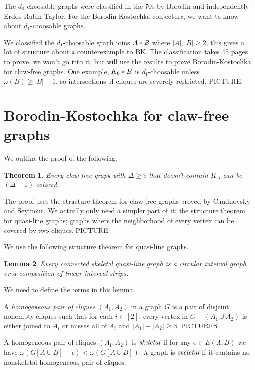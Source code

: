 \documentclass[12pt]{article}
\theoremstyle{plain}
\newtheorem{thm}{Theorem}[section]
\newtheorem{lem}[thm]{Lemma}
\theoremstyle{definition}
\theoremstyle{remark}
\newcommand{\card}[1]{\left|#1\right|}
\newcommand{\irange}[1]{\left[#1\right]}
\newcommand{\join}[2]{#1 \mbox{\hspace{2 pt}$\ast$\hspace{2 pt}} #2}
\begin{document}
The $d_0$-choosable graphs were classified in the 70s by Borodin and independently Erdos-Rubin-Taylor.  For the Borodin-Kostochka conjecture, we want to know about $d_1$-choosable graphs.

We classified the $d_1$-choosable graph joins $\join{A}{B}$ where $\card{A}, \card{B} \geq 2$, this gives a lot of structure about a counterexample to BK.  The classification takes 45 pages to prove, we won't go into it, but will use the results to prove Borodin-Kostochka for claw-free graphs.  One example, $\join{K_6}{B}$ is $d_1$-choosable unless $\omega(B) \geq \card{B} - 1$, so intersections of cliques are severely restricted.  PICTURE.

\section{Borodin-Kostochka for claw-free graphs}

\bigskip
We outline the proof of the following.
\begin{thm}
Every claw-free graph with $\Delta \geq 9$ that doesn't contain $K_{\Delta}$ can be $(\Delta-1)$-colored.
\end{thm}

The proof uses the structure theorem for claw-free graphs proved by Chudnovsky and Seymour. We actually only need a simpler part of it: the structure theorem for quasi-line graphs; graphs where the neighborhood of every vertex can be covered by two cliques.  PICTURE.

\bigskip

We use the following structure theorem for quasi-line graphs.

\begin{lem}\label{QuasilineStructure}
Every connected skeletal quasi-line graph is a circular interval graph or a composition of
linear interval strips.
\end{lem}

We need to define the terms in this lemma.

A \emph{homogeneous pair of cliques} $(A_1, A_2)$ in a graph $G$ is a pair of
disjoint nonempty cliques such that for each $i \in \irange{2}$, every vertex in
$G - (A_1 \cup A_2)$ is either joined to $A_i$ or misses all of $A_i$ and
$\card{A_1} + \card{A_2} \geq 3$. PICTURES.

A homogeneous pair of cliques $(A_1, A_2)$ is $\emph{skeletal}$
if for any $e \in E(A, B)$ we have $\omega(G[A \cup B] - e) < \omega(G[A \cup
B])$.  A graph is $\emph{skeletal}$ if it contains no nonskeletal homogeneous
pair of cliques.  
\end{document}
